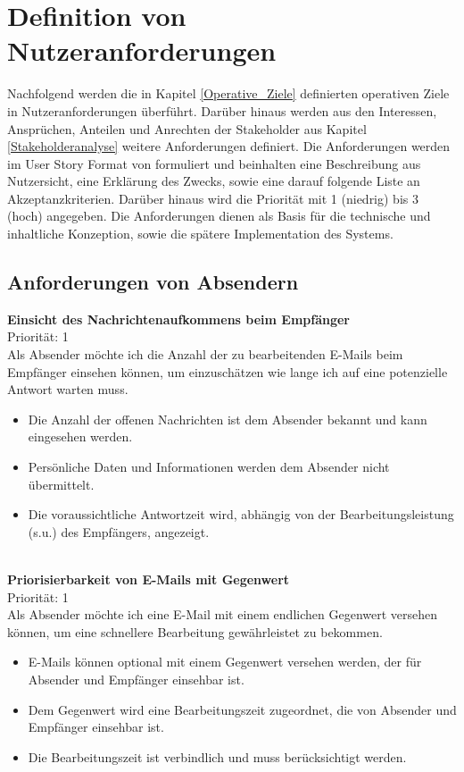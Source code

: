 
\chapter{Definition von Nutzeranforderungen}
\label{Definition_von_Nutzeranforderungen}

Nachfolgend werden die in Kapitel \ref{Operative_Ziele} definierten operativen Ziele in Nutzeranforderungen überführt. Darüber hinaus werden aus den Interessen, Ansprüchen, Anteilen und Anrechten der Stakeholder aus Kapitel \ref{Stakeholderanalyse} weitere Anforderungen definiert. Die Anforderungen werden im User Story Format von \cite{Cohn2004} formuliert und beinhalten eine Beschreibung aus Nutzersicht, eine Erklärung des Zwecks, sowie eine darauf folgende Liste an Akzeptanzkriterien. Darüber hinaus wird die Priorität mit 1 (niedrig) bis 3 (hoch) angegeben. Die Anforderungen dienen als Basis für die technische und inhaltliche Konzeption, sowie die spätere Implementation des Systems.



\section{Anforderungen von Absendern}
\label{Anforderungen_von_Absendern}

\textbf{Einsicht des Nachrichtenaufkommens beim Empfänger} \\
Priorität: 1 \\
Als Absender möchte ich die Anzahl der zu bearbeitenden E-Mails beim Empfänger einsehen können, um einzuschätzen wie lange ich auf eine potenzielle Antwort warten muss.
\begin{itemize}
    \item Die Anzahl der offenen Nachrichten ist dem Absender bekannt und kann eingesehen werden.
    \item Persönliche Daten und Informationen werden dem Absender nicht übermittelt.
    \item Die voraussichtliche Antwortzeit wird, abhängig von der Bearbeitungsleistung (s.u.) des Empfängers, angezeigt.
\end{itemize}

\noindent
\\ \textbf{Priorisierbarkeit von E-Mails mit Gegenwert} \\
Priorität: 1 \\
Als Absender möchte ich eine E-Mail mit einem endlichen Gegenwert versehen können, um eine schnellere Bearbeitung gewährleistet zu bekommen.
\begin{itemize}
    \item E-Mails können optional mit einem Gegenwert versehen werden, der für Absender und Empfänger einsehbar ist.
    \item Dem Gegenwert wird eine Bearbeitungszeit zugeordnet, die von Absender und Empfänger einsehbar ist.
    \item Die Bearbeitungszeit ist verbindlich und muss berücksichtigt werden.
\end{itemize}

